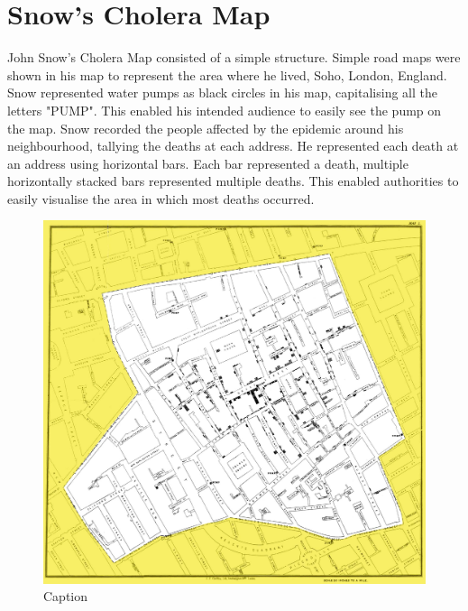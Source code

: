 \documentclass[12pt]{article}
\begin{document}
\section{Snow's Cholera Map}

John Snow's Cholera Map consisted of a simple structure. Simple road maps were shown in his map to represent the area where he lived, Soho, London, England. Snow represented water pumps as black circles in his map, capitalising all the letters "PUMP". This enabled his intended audience to easily see the pump on the map. Snow recorded the people affected by the epidemic around his neighbourhood, tallying the deaths at each address. He represented each death at an address using horizontal bars. Each bar represented a death, multiple horizontally stacked bars represented multiple deaths. This enabled authorities to easily visualise the area in which most deaths occurred.  



\begin{figure}
\centering
\includegraphics{snowmap_1854}
\caption{Caption}
\label{fig:snow}
\end{figure}
\end{document}
